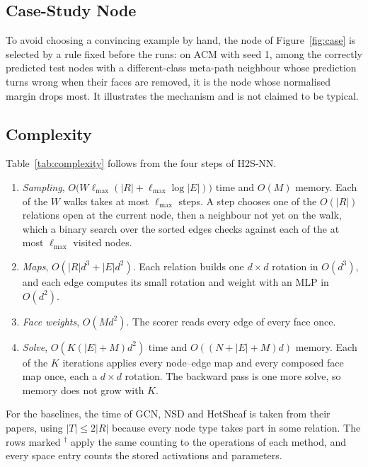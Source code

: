 \documentclass{article}
\newcommand{\method}{\textsc{H2S-NN}}
\begin{document}
\subsection{Case-Study Node}
To avoid choosing a convincing example by hand, the node of Figure~\ref{fig:case} is selected by a rule fixed before the runs: on ACM with seed 1, among the correctly predicted test nodes with a different-class meta-path neighbour whose prediction turns wrong when their faces are removed, it is the node whose normalised margin drops most. It illustrates the mechanism and is not claimed to be typical.

\subsection{Complexity}
Table~\ref{tab:complexity} follows from the four steps of \method{}.
\begin{enumerate}
  \item \emph{Sampling}, $O\big(W\ell_{\max}(|R|+\ell_{\max}\log|E|)\big)$ time and $O(M)$ memory. Each of the $W$ walks takes at most $\ell_{\max}$ steps. A step chooses one of the $O(|R|)$ relations open at the current node, then a neighbour not yet on the walk, which a binary search over the sorted edges checks against each of the at most $\ell_{\max}$ visited nodes.
  \item \emph{Maps}, $O(|R|d^3+|E|d^2)$. Each relation builds one $d\times d$ rotation in $O(d^3)$, and each edge computes its small rotation and weight with an MLP in $O(d^2)$.
  \item \emph{Face weights}, $O(Md^2)$. The scorer reads every edge of every face once.
  \item \emph{Solve}, $O(K(|E|+M)d^2)$ time and $O((N+|E|+M)d)$ memory. Each of the $K$ iterations applies every node--edge map and every composed face map once, each a $d\times d$ rotation. The backward pass is one more solve, so memory does not grow with $K$.
\end{enumerate}
For the baselines, the time of GCN, NSD and HetSheaf is taken from their papers, using $|T|\le2|R|$ because every node type takes part in some relation. The rows marked $^\dagger$ apply the same counting to the operations of each method, and every space entry counts the stored activations and parameters.
\end{document}
